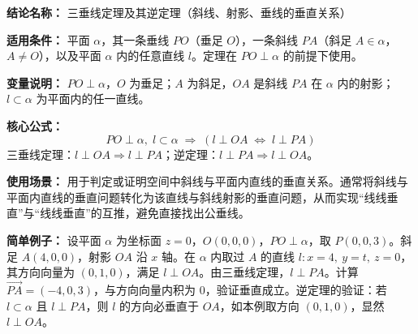 \textbf{结论名称：} 三垂线定理及其逆定理（斜线、射影、垂线的垂直关系）

\textbf{适用条件：} 平面 \(\alpha\)，其一条垂线 \(PO\)（垂足 \(O\)），一条斜线 \(PA\)（斜足 \(A\in\alpha\)，\(A\neq O\)），以及平面 \(\alpha\) 内的任意直线 \(l\)。定理在 \(PO\perp\alpha\) 的前提下使用。

\textbf{变量说明：} \(PO\perp\alpha\)，\(O\) 为垂足；\(A\) 为斜足，\(OA\) 是斜线 \(PA\) 在 \(\alpha\) 内的射影；\(l\subset\alpha\) 为平面内的任一直线。

\textbf{核心公式：}
\[
\boxed{PO\perp\alpha,\; l\subset\alpha \;\Longrightarrow\; (l\perp OA \;\iff\; l\perp PA)}
\]
三垂线定理：\(l\perp OA\Rightarrow l\perp PA\)；逆定理：\(l\perp PA\Rightarrow l\perp OA\)。

\textbf{使用场景：} 用于判定或证明空间中斜线与平面内直线的垂直关系。通常将斜线与平面内直线的垂直问题转化为该直线与斜线射影的垂直问题，从而实现“线线垂直”与“线线垂直”的互推，避免直接找出公垂线。

\textbf{简单例子：} 设平面 \(\alpha\) 为坐标面 \(z=0\)，\(O(0,0,0)\)，\(PO\perp\alpha\)，取 \(P(0,0,3)\)。斜足 \(A(4,0,0)\)，射影 \(OA\) 沿 \(x\) 轴。在 \(\alpha\) 内取过 \(A\) 的直线 \(l\colon x=4,\ y=t,\ z=0\)，其方向向量为 \((0,1,0)\)，满足 \(l\perp OA\)。由三垂线定理，\(l\perp PA\)。计算 \(\overrightarrow{PA}=(-4,0,3)\)，与方向向量内积为 \(0\)，验证垂直成立。逆定理的验证：若 \(l\subset\alpha\) 且 \(l\perp PA\)，则 \(l\) 的方向必垂直于 \(OA\)，如本例取方向 \((0,1,0)\)，显然 \(l\perp OA\)。